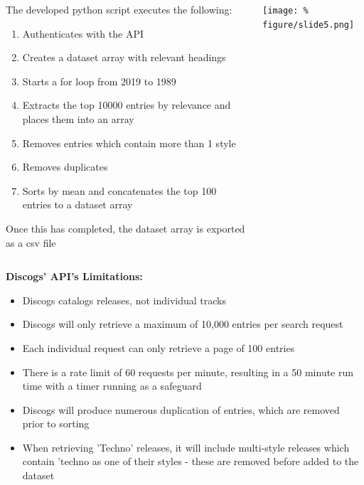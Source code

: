 \documentclass[unknownkeysallowed,usepdftitle=false, parskip=full]{beamer}
\newcommand{\secvariable}{nothing}
\newcommand{\mysection}[1]{\renewcommand{\secvariable}{#1}
}
\begin{document}
\mysection{Execution}
\begin{frame}\label{\secvariable}
  \begin{columns}[t]
    \begin{column}[c]{0.70\textwidth}
    \parbox{\linewidth}{
    The developed python script executes the following:
    \begin{enumerate}
        \item Authenticates with the API
        \item Creates a dataset array with relevant headings
        \item Starts a for loop from 2019 to 1989
        \item Extracts the top 10000 entries by relevance and places them into an array
        \item Removes entries which contain more than 1 style
        \item Removes duplicates
        \item Sorts by mean and concatenates the top 100 entries to a dataset array
    \end{enumerate}
    Once this has completed, the dataset array is exported as a csv file
      }
    \end{column}
    \begin{column}[c]{0.35\textwidth}
\texttt{[image: \%
figure/slide5.png]}\\
    \end{column}
  \end{columns}
\end{frame}

\mysection{Limitations}
\begin{frame}\label{\secvariable}
\parbox{\linewidth}{
\textbf{Discogs' API's Limitations:}
\begin{itemize}
    \item Discogs catalogs releases, not individual tracks
    \item Discogs will only retrieve a maximum of 10,000 entries per search request
    \item Each individual request can only retrieve a page of 100 entries
    \item There is a rate limit of 60 requests per minute, resulting in a 50 minute run time with a timer running as a safeguard
    \item Discogs will produce numerous duplication of entries, which are removed prior to sorting
    \item When retrieving 'Techno' releases, it will include multi-style releases which contain 'techno as one of their styles - these are removed before added to the dataset
\end{itemize}
}
\end{frame}
\end{document}
